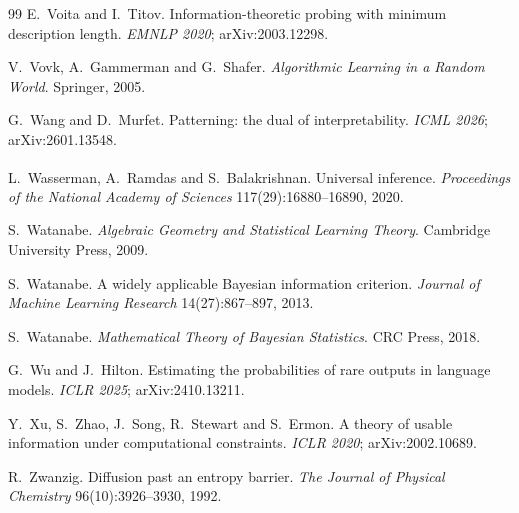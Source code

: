 \documentclass[11pt,a4paper]{article}
\newcommand{\unv}{\textsuperscript{\dag}}
\begin{document}
\begin{thebibliography}{99}
 E.~Voita and I.~Titov. Information-theoretic probing
with minimum description length. \emph{EMNLP 2020}; arXiv:2003.12298.

 V.~Vovk, A.~Gammerman and G.~Shafer. \emph{Algorithmic
Learning in a Random World}. Springer, 2005.

 G.~Wang and D.~Murfet. Patterning: the dual of
interpretability. \emph{ICML 2026}; arXiv:2601.13548.

\unv{} L.~Wasserman, A.~Ramdas and S.~Balakrishnan.
Universal inference. \emph{Proceedings of the National Academy of
Sciences} 117(29):16880--16890, 2020.

 S.~Watanabe. \emph{Algebraic Geometry and
Statistical Learning Theory}. Cambridge University Press, 2009.

 S.~Watanabe. A widely applicable Bayesian information
criterion. \emph{Journal of Machine Learning Research} 14(27):867--897,
2013.

 S.~Watanabe. \emph{Mathematical Theory of Bayesian
Statistics}. CRC Press, 2018.

 G.~Wu and J.~Hilton. Estimating the probabilities
of rare outputs in language models. \emph{ICLR 2025}; arXiv:2410.13211.

 Y.~Xu, S.~Zhao, J.~Song, R.~Stewart and S.~Ermon. A theory
of usable information under computational constraints. \emph{ICLR 2020};
arXiv:2002.10689.

 R.~Zwanzig. Diffusion past an entropy barrier.
\emph{The Journal of Physical Chemistry} 96(10):3926--3930, 1992.

\end{thebibliography}
\end{document}
